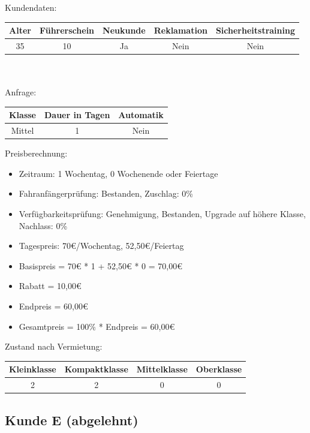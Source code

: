 Kundendaten:\\
\begin{tabular}{|c|c|c|c|c|}
	\hline \textbf{Alter} & \textbf{Führerschein} & \textbf{Neukunde} & \textbf{Reklamation} & \textbf{Sicherheitstraining} \\ 
	\hline 35 & 10 & Ja & Nein & Nein \\ 
	\hline 
\end{tabular} 
\\\\
Anfrage:\\
\begin{tabular}{|c|c|c|}
	\hline \textbf{Klasse} & \textbf{Dauer in Tagen} & \textbf{Automatik} \\ 
	\hline Mittel & 1 & Nein \\ 
	\hline 
\end{tabular}

Preisberechnung:
\begin{itemize}
	\item Zeitraum: 1 Wochentag, 0 Wochenende oder Feiertage
	\item Fahranfängerprüfung: Bestanden, Zuschlag: 0\%
	\item Verfügbarkeitsprüfung: Genehmigung, Bestanden, Upgrade auf höhere Klasse, Nachlass: 0\%
	\item Tagespreis: 70€/Wochentag, 52,50€/Feiertag
	\item Basispreis = 70€ * 1 + 52,50€ * 0 = 70,00€
	\item Rabatt = 10,00€
	\item Endpreis = 60,00€
	\item Gesamtpreis = 100\% * Endpreis = 60,00€
\end{itemize}

Zustand nach Vermietung:\\
\begin{tabular}{|c|c|c|c|}
	\hline \textbf{Kleinklasse} & \textbf{Kompaktklasse} & \textbf{Mittelklasse} & \textbf{Oberklasse}  \\ 
	\hline 2 & 2 & 0 & 0 \\ 
	\hline 
\end{tabular}

\subsection{Kunde E (abgelehnt)}

